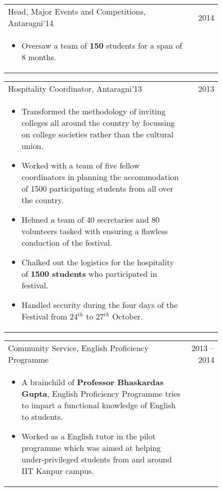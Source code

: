 \documentclass[a4paper,10pt]{article} %
\newcommand{\projectlistdated}[3]{
    \begin{tabular}{p{0.85\linewidth}r}
        \textcolor{NavyBlue}{#2} & \multicolumn{1}{m{3cm}}{\raggedleft \textsc{#1}}\\
        \vspace{-0.3cm}
        \footnotesize{#3}
    \end{tabular}
    \vspace{-0.4cm}
}
\begin{document}
\projectlistdated {2014}
                  {Head, Major Events and Competitions, Antaragni'14}
                  {
                       \begin{itemize}[leftmargin=0.5cm]
                           \item Oversaw a team of \textbf{150} students for a span of 8 months.
                       \end{itemize}
                  }

\projectlistdated {2013}
                  {Hospitality Coordinator, Antaragni'13}
                  {
                       \begin{itemize}[leftmargin=0.5cm]
                           \item Transformed the methodology of inviting colleges all around the country by focussing on
                               college societies rather than the cultural union.
                           \item Worked with a team of five fellow coordinators in planning the accommodation of 1500 participating students
                               from all over the country.
                           \item Helmed a team of 40 secretaries and 80 volunteers tasked with ensuring a flawless conduction of the
                               festival.
                           \item Chalked out the logistics for the hospitality of \textbf{1500 students} who
                               participated in festival.
                           \item Handled security during the four days of the Festival from 24$^{th}$ to 27$^{th}$ October.
                       \end{itemize}
                  }

\projectlistdated {2013 -- 2014}
                  {Community Service, English Proficiency Programme}
                  {
                       \begin{itemize}[leftmargin=0.5cm]
                           \item A brainchild of \textbf{Professor Bhaskardas Gupta}, English Proficiency
                               Programme tries to impart a functional knowledge of English to students.
                           \item Worked as a English tutor in the pilot programme which was aimed at helping
                               under-privileged students from and around IIT Kanpur campus.
                       \end{itemize}
                  }
\end{document}

